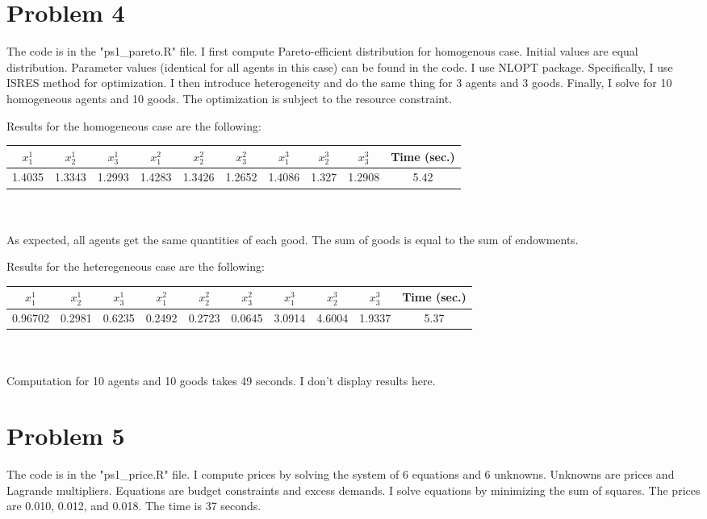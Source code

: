 \documentclass[11pt,a4paper]{article}
\begin{document}
	\section*{Problem 4}
	\noindent The code is in the "ps1\_pareto.R" file. I first compute Pareto-efficient distribution for homogenous case. Initial values are equal distribution. Parameter values (identical for all agents in this case) can be found in the code. I use NLOPT package. Specifically, I use ISRES method for optimization. I then introduce heterogeneity and do the same thing for 3 agents and 3 goods. Finally, I solve for 10 homogeneous agents and 10 goods. The optimization is subject to the resource constraint. 
	
	Results for the homogeneous case are the following:\\
	
	\begin{tabular}{|c|c|c|c|c|c|c|c|c|c|}
		\hline
		$x_1^1$ & $x_2^1$ & $x_3^1$ & $x_1^2$ & $x_2^2$ & $x_3^2$ & $x_1^3$ & $x_2^3$ & $x_3^3$ & Time (sec.) \\
		\hline
		1.4035 & 1.3343 & 1.2993& 1.4283 & 1.3426 & 1.2652& 1.4086 & 1.327 & 1.2908 & 5.42 \\
		\hline
	\end{tabular}
	\\ \\
	As expected, all agents get the same quantities of each good. The sum of goods is equal to the sum of endowments. 
	
	Results for the heteregeneous case are the following:\\
	
	\begin{tabular}{|c|c|c|c|c|c|c|c|c|c|}
		\hline
		$x_1^1$ & $x_2^1$ & $x_3^1$ & $x_1^2$ & $x_2^2$ & $x_3^2$ & $x_1^3$ & $x_2^3$ & $x_3^3$ & Time (sec.) \\
		\hline
		0.96702& 0.2981 & 0.6235 & 0.2492& 0.2723& 0.0645 & 3.0914 & 4.6004 & 1.9337& 5.37 \\
		\hline
	\end{tabular}
	\\ \\
	Computation for 10 agents and 10 goods takes 49 seconds. I don't display results here. 
	
	\section*{Problem 5}
	\noindent The code is in the "ps1\_price.R" file. I compute prices by solving the system of 6 equations and 6 unknowns. Unknowns are prices and Lagrande multipliers. Equations are budget constraints and excess demands. I solve equations by minimizing the sum of squares. The prices are 0.010, 0.012, and 0.018. The time is 37 seconds. 
	
\end{document}
